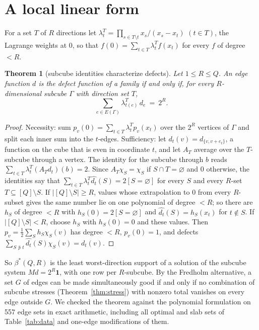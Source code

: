 \documentclass[11pt]{article}
\newtheorem{theorem}{Theorem}
\theoremstyle{definition}
\theoremstyle{remark}
\begin{document}
\section{A local linear form}\label{sec:local}

For a set $T$ of $R$ directions let $\lambda^T_t=\prod_{s\in T\setminus t}x_s/(x_s-x_t)$ $(t\in T)$, the Lagrange weights at $0$, so that $f(0)=\sum_{t\in T}\lambda^T_tf(x_t)$ for every $f$ of degree $<R$.

\begin{theorem}[subcube identities characterize defects]\label{thm:local}
Let $1\le R\le Q$. An edge function $d$ is the defect function of a family if and only if, for every $R$-dimensional subcube $\Gamma$ with direction set $T$,
\[
\sum_{e\in E(\Gamma)}\lambda^T_{t(e)}\,d_e\ =\ 2^R .
\]
\end{theorem}

\begin{proof}
Necessity: sum $p_v(0)=\sum_{t\in T}\lambda^T_tp_v(x_t)$ over the $2^R$ vertices of $\Gamma$ and split each inner sum into the $t$-edges. Sufficiency: let $d_t(v)=d_{\{v,v+e_t\}}$, a function on the cube that is even in coordinate $t$, and let $A_T$ average over the $T$-subcube through a vertex. The identity for the subcube through $b$ reads $\sum_{t\in T}\lambda^T_t(A_Td_t)(b)=2$. Since $A_T\chi_S=\chi_S$ if $S\cap T=\varnothing$ and $0$ otherwise, the identities say that $\sum_{t\in T}\lambda^T_t\widehat{d_t}(S)=2[S=\varnothing]$ for every $S$ and every $R$-set $T\subseteq[Q]\setminus S$. If $|[Q]\setminus S|\ge R$, values whose extrapolation to $0$ from every $R$-subset gives the same number lie on one polynomial of degree $<R$; so there are $h_S$ of degree $<R$ with $h_S(0)=2[S=\varnothing]$ and $\widehat{d_t}(S)=h_S(x_t)$ for $t\notin S$. If $|[Q]\setminus S|<R$, choose $h_S$ with $h_S(0)=0$ and these values. Then $p_v=\frac12\sum_Sh_S\chi_S(v)$ has degree $<R$, $p_v(0)=1$, and defects $\sum_{S\not\ni t}\widehat{d_t}(S)\chi_S(v)=d_t(v)$.
\end{proof}

So $\beta^*(Q,R)$ is the least worst-direction support of a solution of the subcube system $Md=2^R\mathbf1$, with one row per $R$-subcube. By the Fredholm alternative, a set $G$ of edges can be made simultaneously good if and only if no combination of subcube stresses (Theorem~\ref{thm:stress}) with nonzero total vanishes on every edge outside $G$. We checked the theorem against the polynomial formulation on 557 edge sets in exact arithmetic, including all optimal and slab sets of Table~\ref{tab:data} and one-edge modifications of them.
\end{document}
